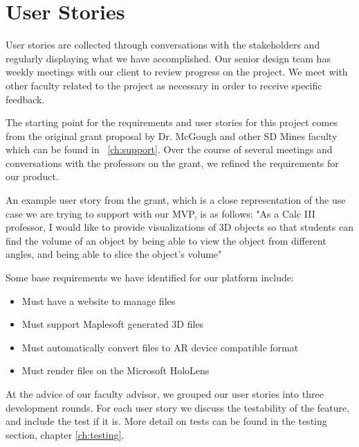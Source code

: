 \section{User Stories}


User stories are collected through conversations with the stakeholders and
regularly displaying what we have accomplished. Our senior design team has
weekly meetings with our client to review progress on the project. We meet
with other faculty related to the project as necessary in order to receive
specific feedback.

The starting point for the requirements and user stories for this project comes
from the original grant proposal by Dr. McGough and other SD Mines faculty
which can be found in ~\autoref{ch:support}. Over the course of several
meetings and conversations with the professors on the grant, we refined the
requirements for our product.

An example user story from the grant, which is a close representation of the
use case we are trying to support with our MVP, is as follows: "As a Calc III
professor, I would like to provide visualizations of 3D objects so that
students can find the volume of an object by being able to view the object
from different angles, and being able to slice the object's volume"

Some base requirements we have identified for our platform include:
\begin{itemize}
	\item Must have a website to manage files
	\item Must support Maplesoft generated 3D files
	\item Must automatically convert files to AR device compatible format
	\item Must render files on the Microsoft HoloLens
\end{itemize}

At the advice of our faculty advisor, we grouped our user stories into three 
development rounds. For each user story we discuss the testability of the 
feature, and include the test if it is. More detail on tests can be found in the testing section, chapter \ref{ch:testing}.


